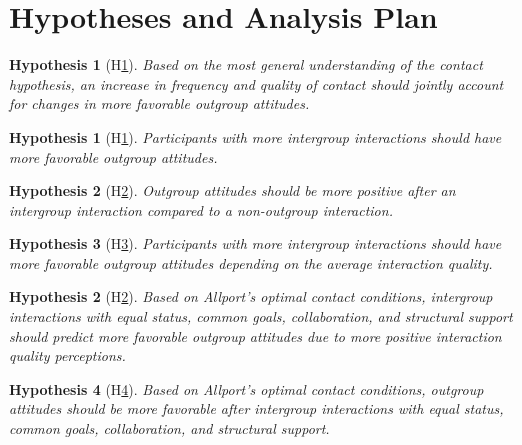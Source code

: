 \documentclass[man, 12pt, a4paper, mask]{apa7}
\theoremstyle{break}
\theoremstyle{plain}
\newtheorem{hyp}{Hypothesis}
\newtheorem{subhyp}{Hypothesis}
\begin{document}
\printbibliography

\appendix

\section{Hypotheses and Analysis Plan}
\label{app:AppendixHypotheses}

\begin{hyp}[H\ref{hyp:contact}] \label{hyp:contact}
Based on the most general understanding of the contact hypothesis, an increase in frequency and quality of contact should jointly account for changes in more favorable outgroup attitudes.
\end{hyp}

\begin{subhyp}[H\ref{hyp:contactFreq}] \label{hyp:contactFreq}
\addtolength{\leftskip}{2.5em}
Participants with more intergroup interactions should have more favorable outgroup attitudes.
\end{subhyp}

\begin{subhyp}[H\ref{hyp:contactDummy}] \label{hyp:contactDummy}
\addtolength{\leftskip}{2.5em}
Outgroup attitudes should be more positive after an intergroup interaction compared to a non-outgroup interaction.
\end{subhyp}

\begin{subhyp}[H\ref{hyp:contactFreqQual}] \label{hyp:contactFreqQual}
\addtolength{\leftskip}{2.5em}
Participants with more intergroup interactions should have more favorable outgroup attitudes depending on the average interaction quality.
\end{subhyp}

\begin{hyp}[H\ref{hyp:AllportsConditions}] \label{hyp:AllportsConditions}
Based on Allport's optimal contact conditions, intergroup interactions with equal status, common goals, collaboration, and structural support should predict more favorable outgroup attitudes due to more positive interaction quality perceptions.
\end{hyp}

\setcounter{subhyp}{0}
\begin{subhyp}[H\ref{hyp:AllportsPred}] \label{hyp:AllportsPred}
\addtolength{\leftskip}{2.5em}
Based on Allport's optimal contact conditions, outgroup attitudes should be more favorable after intergroup interactions with equal status, common goals, collaboration, and structural support.
\end{subhyp}
\end{document}
